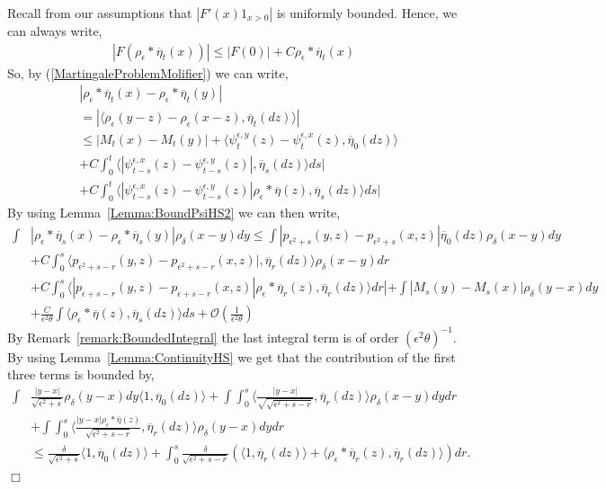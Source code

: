 \documentclass[12pt]{article}
\newenvironment {proof}{{\noindent\bf Proof }}{\hfill $\Box$ \medskip}
\begin{document}
\begin{proof}
Recall from our assumptions that $|F'(x)1_{x>0}|$ is uniformly bounded. Hence, we can always write,
\begin{align} \label{StrongBoundOnF}
|F(\rho_\epsilon*\overline{\eta}_t(x))| \leq |F(0)| + C \rho_\epsilon*\overline{\eta}_t(x)
\end{align}
So, by (\ref{MartingaleProblemMolifier}) we can write,
\begin{align}
& |\rho_\epsilon*\overline{\eta}_t(x)-\rho_\epsilon*\overline{\eta}_t(y)| \nonumber \\ &= |\langle \rho_\epsilon(y-z)-\rho_\epsilon(x-z),\overline{\eta}_t(dz) \rangle | \nonumber\\ &\leq  |M_t(x)-M_t(y)|  +\langle \psi_t^{\epsilon,y}(z)-\psi_t^{\epsilon,x}(z), \overline{\eta}_0(dz)\rangle \nonumber \\ &+ C\int_0^t \langle |\psi_{t-s}^{\epsilon,x}(z) - \psi_{t-s}^{\epsilon, y}(z) |, \overline{\eta}_s(dz) \rangle  ds | \\ &+ C \int_0^t \langle |\psi_{t-s}^{\epsilon,x}(z) - \psi_{t-s}^{\epsilon, y}(z) | \rho_\epsilon*\overline{\eta}(z), \overline{\eta}_s(dz) \rangle  ds | \label{eq:bound1CE} \end{align} 
By using Lemma~\ref{Lemma:BoundPsiHS2} we can then write, 
\begin{align*}
 \int &|\rho_\epsilon*\overline{\eta}_s(x) -\rho_\epsilon*\overline{\eta}_s(y)| \rho_\delta(x-y) dy  \leq \int |p_{\epsilon^2+s}(y,z)-p_{\epsilon^2+s}(x,z)|\overline{\eta}_0(dz) \rho_\delta(x-y)dy \\&+ C\int_0^s \langle p_{\epsilon^2+s-r}(y,z)-p_{\epsilon^2+s-r}(x,z)|, \overline{\eta}_r(dz) \rangle \rho_\delta (x-y) dr  \\  & + C \int_0^s \langle |p_{\epsilon+s-r}(y,z) - p_{\epsilon+s-r}(x,z) | \rho_\epsilon*\overline{\eta}_r(z), \overline{\eta}_r(dz) \rangle  dr | + \int|M_s(y)-M_s(x)| \rho_\delta(y-x)dy  \\  & + \frac{C}{\epsilon^2 \theta} \int \langle \rho_\epsilon*\overline{\eta}(z),\overline{\eta}_s(dz)\rangle ds   +\mathcal{O}\left( \frac{1}{\epsilon^2 \theta} \right) 
\end{align*}
By Remark~\ref{remark:BoundedIntegral} the last integral term is of order $(\epsilon^2 \theta)^{-1}$. By using Lemma~\ref{Lemma:ContinuityHS} we get that the contribution of the first three terms is bounded by,
\begin{align*}
\int &\frac{|y-x|}{\sqrt{\epsilon^2+s}} \rho_{\delta}(y-x) dy \langle 1, \overline{\eta}_0(dz)\rangle + \int \int_0^s  \langle \frac{|y-x|}{\sqrt{\sqrt{\epsilon^2+s-r}}}, \overline{\eta}_r(dz) \rangle \rho_\delta(x-y) dy dr \\ & +  \int \int_0^s \langle \frac{|y-x| \rho_\epsilon*\overline{\eta}(z)}{\sqrt{\epsilon^2+s-r}}, \overline{\eta}_r(dz) \rangle \rho_\delta(y-x) dy dr \\ & \leq \frac{\delta}{\sqrt{\epsilon^2+s}} \langle 1, \overline{\eta}_0(dz) \rangle + \int_0^s \frac{\delta}{\sqrt{\epsilon^2+s-r}} (\langle 1, \overline{\eta}_r(dz) \rangle + \langle \rho_\epsilon*\overline{\eta}_r(z), \overline{\eta}_r(dz) \rangle) dr.

\end{align*}
\end{proof}
\end{document}

